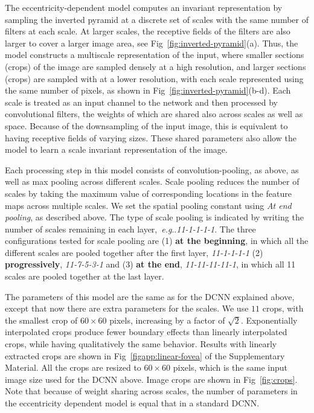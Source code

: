 \documentclass{article}
\makeatletter
\DeclareRobustCommand\onedot{\futurelet\@let@token\@onedot}
\def\@onedot{\ifx\@let@token.\else.\null\fi\xspace}
\def\eg{\emph{e.g}\onedot} \def\Eg{\emph{E.g}\onedot}
\makeatother
\begin{document}
The eccentricity-dependent model computes an invariant representation by sampling the inverted pyramid at a discrete set of scales with the same number of filters at each scale.  At larger scales, the receptive fields of the filters are also larger to cover a larger image area, see Fig~\ref{fig:inverted-pyramid}(a).   
Thus, the model constructs a multiscale representation of the input, where smaller sections (crops) of the image are sampled densely at a high resolution, and larger sections (crops) are sampled with at a lower resolution, with each scale represented using the same number of pixels, as shown in Fig~\ref{fig:inverted-pyramid}(b-d).
Each scale is treated as an input channel to the network and then processed by convolutional filters, the weights of which are shared also across scales as well as space.  Because of the downsampling of the input image, this is equivalent to having receptive fields of varying sizes. These shared parameters also allow the model to learn a scale invariant representation of the image. 

Each processing step in this model consists of convolution-pooling, as above, as well as max pooling across different scales.  Scale pooling reduces the number of scales by taking the maximum value of corresponding locations in the feature maps across multiple scales. We set the spatial pooling constant using \emph{At end pooling}, as described above.  The type of scale pooling is indicated by writing the number of scales remaining in each layer,~\eg\emph{11-1-1-1-1}. The three configurations tested for scale pooling are (1) {\bf at the beginning}, in which all the different scales are pooled together after the first layer, \emph{11-1-1-1-1} (2) {\bf progressively}, \emph{11-7-5-3-1} and (3) {\bf at the end}, \emph{11-11-11-11-1}, in which all 11 scales are pooled together at the last layer.

The parameters of this model are the same as for the DCNN explained above, except that now there are extra parameters for the scales. We use $11$ crops, with the smallest crop of $60\times 60$ pixels, increasing by a factor of $\sqrt{2}$. Exponentially interpolated crops produce fewer boundary effects than linearly interpolated crops, while having qualitatively the same behavior. Results with linearly extracted crops are shown in Fig~\ref{figapp:linear-fovea} of the Supplementary Material. All the crops are resized to $60\times 60$ pixels, which is the same input image size used for the DCNN above. Image crops are shown in Fig~\ref{fig:crops}. Note that because of weight sharing across scales, the number of parameters in the eccentricity dependent model is equal that in a standard DCNN.
\end{document}

